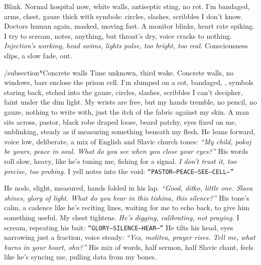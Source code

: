 \documentclass[12pt]{article}
\newcommand{\note}[1]{\texttt{#1}}
\begin{document}
Blink. Normal hospital now, white walls, antiseptic sting, no rot. I’m bandaged, arms, chest, gauze thick with symbols: circles, slashes, scribbles I don’t know. Doctors human again, masked, moving fast. A monitor blinks, heart rate spiking. I try to scream, notes, anything, but throat’s dry, voice cracks to nothing. \textit{Injection’s working, head swims, lights pulse, too bright, too real.} Consciousness slips, a slow fade, out.

/subsection*{Concrete walls}
Time unknown, third wake. Concrete walls, no windows, bars enclose the prison cell. I’m slumped on a cot, bandaged, , symbols staring back, etched into the gauze, circles, slashes, scribbles I can’t decipher, faint under the dim light. My wrists are free, but my hands tremble, no pencil, no gauze, nothing to write with, just the itch of the fabric against my skin. A man sits across, pastor, black robe draped loose, beard patchy, eyes fixed on me, unblinking, steady as if measuring something beneath my flesh. He leans forward, voice low, deliberate, a mix of English and Slavic church tones: \textit{“My child, pokoj be yours, peace in soul. What do you see when you close your eyes?”} His words roll slow, heavy, like he’s tuning me, fishing for a signal. \textit{I don’t trust it, too precise, too probing.} I yell notes into the void: \note{“PASTOR—PEACE—SEE—CELL—”}

He nods, slight, measured, hands folded in his lap. \textit{“Good, ditko, little one. Slava shines, glory of light. What do you hear in this tishina, this silence?”} His tone’s calm, a cadence like he’s reciting lines, waiting for me to echo back, to give him something useful. My chest tightens. \textit{He’s digging, calibrating, not praying.} I scream, repeating his bait: \note{“GLORY—SILENCE—HEAR—”} He tilts his head, eyes narrowing just a fraction, voice steady: \textit{“Yes, molitva, prayer rises. Tell me, what burns in your heart, ohn?”} His mix of words, half sermon, half Slavic chant, feels like he’s syncing me, pulling data from my bones.
\end{document}
